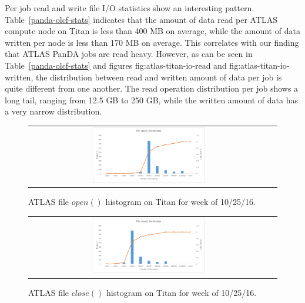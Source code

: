 Per job read and write file I/O statistics show an interesting pattern.
Table~\ref{panda-olcf-stats} indicates that the amount of data read per ATLAS
compute node on Titan is less than 400 MB on average, while the amount of data
written per node is less than 170 MB on average. This correlates with our
finding that ATLAS PanDA jobs are read heavy. However, as can be seen in
Table~\ref{panda-olcf-stats} and figures {fig:atlas-titan-io-read} and
{fig:atlas-titan-io-written}, the distribution between read and written amount
of data per job is quite different from one another. The read operation distribution
per job shows a long tail, ranging from 12.5 GB to 250 GB, while the written
amount of data has a very narrow distribution.

\begin{figure}[!htb]
    \centering
    \begin{tabular}{cc}
        {\includegraphics[width=0.48\textwidth]{figures/panda_file_open_hist.pdf}}\\
    \end{tabular}
    \caption{ATLAS file $open()$ histogram on Titan for week of 10/25/16.}
\label{fig:atlas-titan-file-open}
\end{figure}


\begin{figure}[!htb]
    \centering
    \begin{tabular}{cc}
        {\includegraphics[width=0.48\textwidth]{figures/panda_file_close_hist.pdf}}\\
    \end{tabular}
    \caption{ATLAS file $close()$ histogram on Titan for week of 10/25/16.}
\label{fig:atlas-titan-file-close}
\end{figure}

